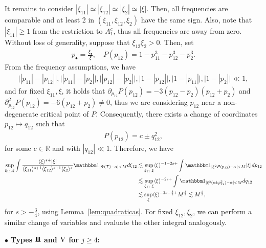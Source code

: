 \documentclass[%
11pt,  reqno]{amsart}
\newcommand{\III}{\textup{I \hspace{-2.9mm} I \hspace{-2.9mm} I}}
\newcommand{\5}{\textup{V}}
\newcommand{\noi}{\noindent}
\newcommand{\ind}{\mathbbm 1}
\newcommand{\les}{\lesssim}
\theoremstyle{remark}
\newcommand{\R}{\mathbb{R}}
\newcommand{\bul}{\bullet}
\newcommand{\TT}{\mathcal{T}}
\newcommand{\al}{\alpha}
\newcommand{\jb}[1]
{\langle #1 \rangle}
\numberwithin{equation}{section}
\numberwithin{theorem}{section}
\begin{document}
It remains to consider $|\xi_{11}| \simeq |\xi_{12}| \simeq |\xi_2| \simeq |\xi|$. Then, all frequencies are comparable and at least 2 in $(\xi_{11}, \xi_{12}, \xi_2)$ have the same sign.
Also, note that $|\xi_{11}| \ge 1$ from the restriction to $A_1^c$, thus all frequencies are away from zero. 
Without loss of generality, suppose that $\xi_{12} \xi_2 >0$. Then, set
\begin{align}
    p_\bul = \frac{\xi_\bul}{\xi}, \quad P(p_{12}) = 1 - p_{11}^3 - p_{12}^3 - p_2^3. 
\end{align}
From the frequency assumptions, we have
\begin{align}
    \big| |p_{11}| - |p_{12}| \big| , 
    \big| |p_{11}| - |p_{2}| \big| , 
    \big| |p_{12}| - |p_{2}| \big| , 
    \big| 1 - |p_{12}| \big| , 
    \big| 1 - |p_{11}| \big| , 
    \big| 1 - |p_{2}| \big| \ll 1, 
\end{align}
and for fixed $\xi_{11}, \xi$, it holds that $\partial_{p_{12}} P(p_{12}) = -3 (p_{12} - p_2) (p_{12} + p_2) $ and $\partial^2_{p_{12}}P(p_{12}) = -6 (p_{12} + p_2) \ne 0$, thus we are considering $p_{12}$ near a non-degenerate critical point of $P$. Consequently, there exists a change of coordinates $p_{12} \mapsto q_{12}$ such that
\begin{align}
    P(p_{12}) = c \pm q_{12}^2, 
\end{align}
for some $c\in\R$ 
and with $|q_{12}| \ll 1$. Therefore, we have
\begin{align}
\sup_{\xi_{11}, \xi} \int 
\frac{\jb{\xi}^{s+} |\xi|  }{ \jb{\xi_{11}}^{s+1} \jb{\xi_{12}}^{s+1} \jb{\xi_{2}}^s}
    \ind_{|\Psi(\TT)- \al | < M } d\xi_{12}
    &
    \les \sup_{\xi_{11}, \xi} 
    \jb{\xi}^{-1-2s+} 
    \int \ind_{|\xi^2P(p_{12}) - \al | < M } |\xi| d p_{12} 
    \\
    &
    \les \sup_{\xi_{11}, \xi} 
    \jb{\xi}^{-2s+}
    \int \ind_{|\xi^3(c \pm p_{12}^2) - \al| < M} dq_{12}
    \\
    &
    \les \sup_\xi \jb{\xi}^{-2s - \frac32 + } M^\frac12 \les M^\frac12, 
\end{align}
for $s>-\frac34$, using Lemma~\ref{lem:quadraticas}. For fixed $\xi_{12}, \xi_2$, we can perform a similar change of variables and evaluate the other integral analogously. 


\smallskip
\noi
$\bul$ \textbf{Types $\III$ and $\5$ for $j\ge 4$:}
\end{document}
